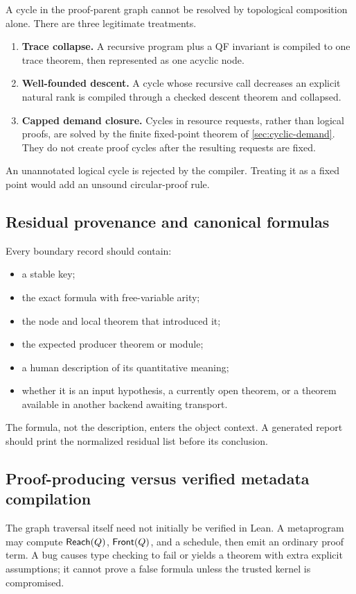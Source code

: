 A cycle in the proof-parent graph cannot be resolved by topological composition alone.  There are three legitimate treatments.
\begin{enumerate}
  \item \textbf{Trace collapse.}  A recursive program plus a QF invariant is compiled to one trace theorem, then represented as one acyclic node.
  \item \textbf{Well-founded descent.}  A cycle whose recursive call decreases an explicit natural rank is compiled through a checked descent theorem and collapsed.
  \item \textbf{Capped demand closure.}  Cycles in resource requests, rather than logical proofs, are solved by the finite fixed-point theorem of \cref{sec:cyclic-demand}.  They do not create proof cycles after the resulting requests are fixed.
\end{enumerate}
An unannotated logical cycle is rejected by the compiler.  Treating it as a fixed point would add an unsound circular-proof rule.

\subsection{Residual provenance and canonical formulas}

Every boundary record should contain:
\begin{itemize}
  \item a stable key;
  \item the exact formula with free-variable arity;
  \item the node and local theorem that introduced it;
  \item the expected producer theorem or module;
  \item a human description of its quantitative meaning;
  \item whether it is an input hypothesis, a currently open theorem, or a theorem available in another backend awaiting transport.
\end{itemize}
The formula, not the description, enters the object context.  A generated report should print the normalized residual list before its conclusion.

\subsection{Proof-producing versus verified metadata compilation}

The graph traversal itself need not initially be verified in Lean.  A metaprogram may compute \(\mathsf{Reach}(Q)\), \(\mathsf{Front}(Q)\), and a schedule, then emit an ordinary proof term.  A bug causes type checking to fail or yields a theorem with extra explicit assumptions; it cannot prove a false formula unless the trusted kernel is compromised.

